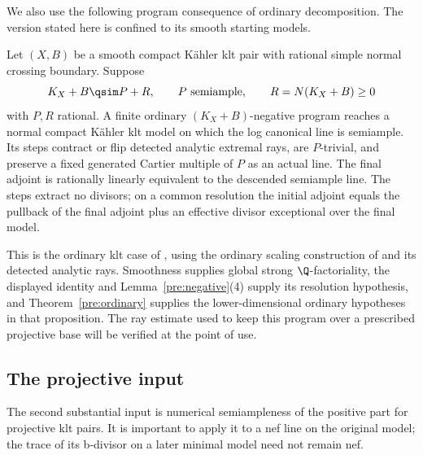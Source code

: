 We also use the following program consequence of ordinary decomposition.
The version stated here is confined to its smooth starting models.

\begin{proposition}\label{pre:contract}
Let \((X,B)\) be a smooth compact K\"ahler klt pair with rational
simple normal crossing boundary. Suppose
\[
 K_X+B\qsim P+R,\qquad P\text{ semiample},\qquad
 R=N(K_X+B)\geq0
\]
with \(P,R\) rational. A finite ordinary \((K_X+B)\)-negative program
reaches a normal compact K\"ahler klt model on which the log canonical
line is semiample. Its steps contract or flip detected analytic extremal
rays, are \(P\)-trivial, and preserve a fixed generated Cartier multiple
of \(P\) as an actual line. The final adjoint is rationally linearly
equivalent to the descended semiample line. The steps extract no
divisors; on a common resolution the initial adjoint equals the
pullback of the final adjoint plus an effective divisor exceptional
over the final model.
\end{proposition}

This is the ordinary klt case of
\cite[Proposition~3.8]{K}, using the ordinary scaling construction of
\cite[Lemma~3.6]{K} and its detected analytic rays. Smoothness supplies
global strong \(\Q\)-factoriality, the displayed identity and
Lemma~\ref{pre:negative}(4) supply its resolution hypothesis, and
Theorem~\ref{pre:ordinary} supplies the lower-dimensional ordinary
hypotheses in that proposition.
The ray estimate used to keep this program over a prescribed
projective base will be verified at the point of use.

\subsection{The projective input}

The second substantial input is numerical semiampleness of the positive
part for projective klt pairs. It is important to apply it to a nef
line on the original model; the trace of its b-divisor on a later
minimal model need not remain nef.

